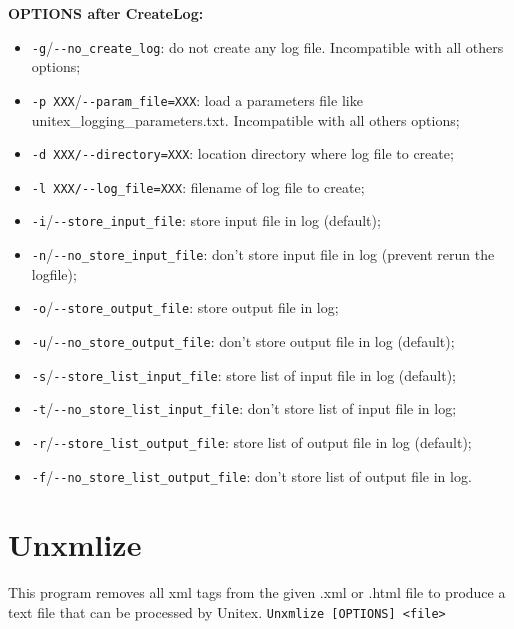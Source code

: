 \bigskip
\noindent \textbf{OPTIONS after CreateLog:}
\begin{itemize}
  \item \verb+-g+/\verb+--no_create_log+: do not create any log file. Incompatible with all others options;

  \item \verb+-p XXX+/\verb+--param_file=XXX+: load a parameters file like unitex\_logging\_parameters.txt. Incompatible with all others options;

  \item \verb+-d XXX/--directory=XXX+: location directory where log file to create;
  \item \verb+-l XXX/--log_file=XXX+: filename of log file to create;
  \item \verb+-i+/\verb+--store_input_file+: store input file in log (default);
  \item \verb+-n+/\verb+--no_store_input_file+: don't store input file in log (prevent rerun the logfile);
  \item \verb+-o+/\verb+--store_output_file+: store output file in log;
  \item \verb+-u+/\verb+--no_store_output_file+: don't store output file in log (default);
  \item \verb+-s+/\verb+--store_list_input_file+: store list of input file in log (default);
  \item \verb+-t+/\verb+--no_store_list_input_file+: don't store list of input file in log;
  \item \verb+-r+/\verb+--store_list_output_file+: store list of output file in log (default);
  \item \verb+-f+/\verb+--no_store_list_output_file+: don't store list of output file in log.
\end{itemize}



\section{Unxmlize}
\label{section-Unxmlize}

This program removes all xml tags from the given .xml or .html file to produce a text file that 
can be processed by Unitex.
\bigskip
\noindent
\verb+Unxmlize [OPTIONS] <file>+           


